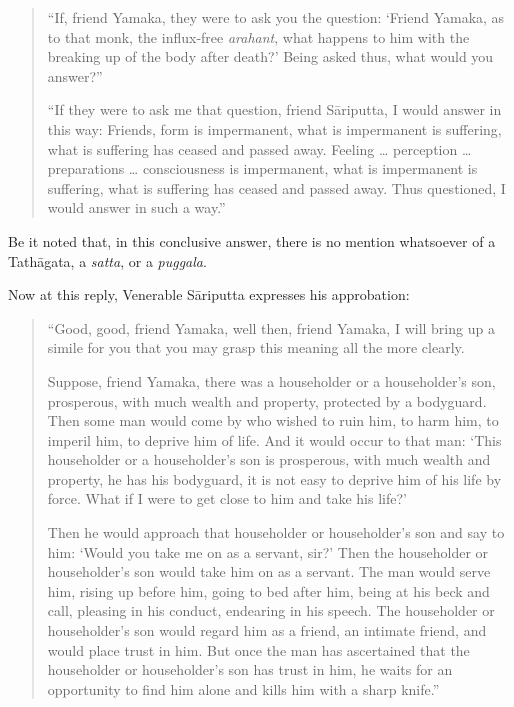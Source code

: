 \begin{quote}
``If, friend Yamaka, they were to ask you the question: `Friend Yamaka, as to that monk, the influx-free \emph{arahant}, what happens to him with the breaking up of the body after death?' Being asked thus, what would you answer?''

``If they were to ask me that question, friend Sāriputta, I would answer in this way: Friends, form is impermanent, what is impermanent is suffering, what is suffering has ceased and passed away. Feeling \ldots{} perception \ldots{} preparations \ldots{} consciousness is impermanent, what is impermanent is suffering, what is suffering has ceased and passed away. Thus questioned, I would answer in such a way.''
\end{quote}

Be it noted that, in this conclusive answer, there is no mention whatsoever of a Tathāgata, a \emph{satta}, or a \emph{puggala}.

Now at this reply, Venerable Sāriputta expresses his approbation:

\begin{quote}
``Good, good, friend Yamaka, well then, friend Yamaka, I will bring up a simile for you that you may grasp this meaning all the more clearly.

Suppose, friend Yamaka, there was a householder or a householder's son, prosperous, with much wealth and property, protected by a bodyguard. Then some man would come by who wished to ruin him, to harm him, to imperil him, to deprive him of life. And it would occur to that man: `This householder or a householder's son is prosperous, with much wealth and property, he has his bodyguard, it is not easy to deprive him of his life by force. What if I were to get close to him and take his life?'

Then he would approach that householder or householder's son and say to him: `Would you take me on as a servant, sir?' Then the householder or householder's son would take him on as a servant. The man would serve him, rising up before him, going to bed after him, being at his beck and call, pleasing in his conduct, endearing in his speech. The householder or householder's son would regard him as a friend, an intimate friend, and would place trust in him. But once the man has ascertained that the householder or householder's son has trust in him, he waits for an opportunity to find him alone and kills him with a sharp knife.''
\end{quote}


